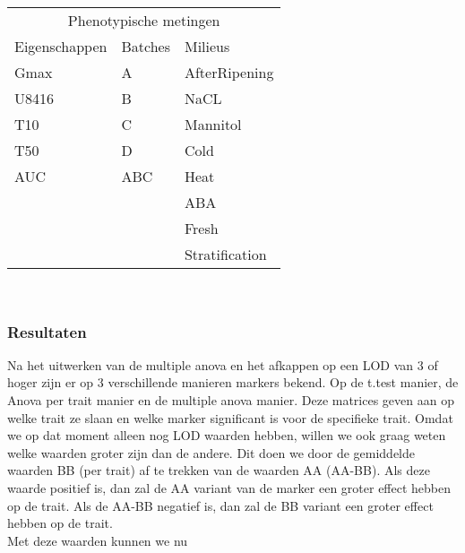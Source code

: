 \documentclass[12pt,a4paper, twocolumn]{article}
\begin{document}
\begin{tabular} {l  l  l}
\multicolumn{3}{c}{Phenotypische metingen} \\
Eigenschappen & Batches & Milieus\\ 
\hline 
Gmax & A & AfterRipening\\
U8416 & B & NaCL\\
T10 & C & Mannitol\\
T50 & D & Cold\\
AUC & ABC & Heat\\
 &  & ABA\\
 &  & Fresh\\
 &  & Stratification\\
\end{tabular}\\
\subsubsection*{Resultaten}
Na het uitwerken van de multiple anova en het afkappen op een LOD van 3 of hoger zijn er op 3 verschillende manieren markers bekend. 
Op de t.test manier, de Anova per trait manier en de multiple anova manier. 
Deze matrices geven aan op welke trait ze slaan en welke marker significant is voor de specifieke trait.
Omdat we op dat moment alleen nog LOD waarden hebben, willen we ook graag weten welke waarden groter zijn dan de andere. 
Dit doen we door de gemiddelde waarden BB (per trait) af te trekken van de waarden AA (AA-BB).
Als deze waarde positief is, dan zal de AA variant van de marker een groter effect hebben op de trait. 
Als de AA-BB negatief is, dan zal de BB variant een groter effect hebben op de trait. \\
Met deze waarden kunnen we nu 
\end{document}
